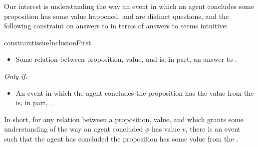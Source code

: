 \begin{note}
  Our interest is understanding the way an event in which an agent concludes some proposition has some value happened.
  \qWhy{} and \qHow{} are distinct questions, and the following constraint on answers to \qWhy{} in terms of answers to \qHow{} seems intuitive:

  \begin{restatable}[\issueInclusion{}]{constraint}{issueInclusionFirst}
    \label{issue:why-inc-in-how}
    \mbox{ }
    \vspace{-\baselineskip}
    \begin{itemize}
    \item
      Some relation between proposition, value, and \pool{} is, in part, an answer to \qWhy{}.
    \end{itemize}
    \emph{Only if:}
    \begin{itemize}
    \item
      An event in which the agent concludes the proposition has the value from the \pool{} is, in part, \qHow{}.
    \end{itemize}
    \vspace{-\baselineskip}
  \end{restatable}

  In short, for any relation between a proposition, value, and \pool{} which grants some understanding of the way an agent concluded \(\phi\) has value \(v\), there is an event such that the agent has concluded the proposition has some value from the \pool{}.
\end{note}


